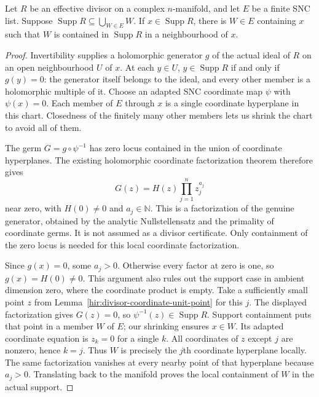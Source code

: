 \begin{lemma}
\label{hir:divisor-supported-local-component}
\leanok
Let $R$ be an effective divisor on a complex $n$-manifold, and let $E$
be a finite SNC list.  Suppose $\operatorname{Supp}R\subseteq\bigcup_{W\in E}W$.
If $x\in\operatorname{Supp}R$, there is $W\in E$ containing $x$ such
that $W$ is contained in $\operatorname{Supp}R$ in a neighbourhood of $x$.
\end{lemma}
\begin{proof}
Invertibility supplies a holomorphic generator $g$ of the actual ideal
of $R$ on an open neighbourhood $U$ of $x$.  At each $y\in U$,
$y\in\operatorname{Supp}R$ if and only if $g(y)=0$: the generator itself
belongs to the ideal, and every other member is a holomorphic multiple
of it.  Choose an adapted SNC coordinate map $\psi$ with $\psi(x)=0$.
Each member of $E$ through $x$ is a single coordinate hyperplane in this
chart.  Closedness of the finitely many other members lets us shrink
the chart to avoid all of them.

The germ $G=g\circ\psi^{-1}$ has zero locus contained in the union of
coordinate hyperplanes.  The existing holomorphic coordinate
factorization theorem therefore gives
\[
 G(z)=H(z)\prod_{j=1}^n z_j^{a_j}
\]
near zero, with $H(0)\ne0$ and $a_j\in\mathbb N$.  This is a factorization
of the genuine generator, obtained by the analytic Nullstellensatz and
the primality of coordinate germs.  It is not assumed as a divisor
certificate.  Only containment of the zero locus is needed for this
local coordinate factorization.

Since $g(x)=0$, some $a_j>0$.  Otherwise every factor at zero is one,
so $g(x)=H(0)\ne0$.  This argument also rules out the support case in
ambient dimension zero, where the coordinate product is empty.
Take a sufficiently small point $z$ from
Lemma~\ref{hir:divisor-coordinate-unit-point} for this $j$.  The displayed
factorization gives $G(z)=0$, so $\psi^{-1}(z)\in\operatorname{Supp}R$.
Support containment puts that point in a member $W$ of $E$; our shrinking
ensures $x\in W$.  Its adapted coordinate equation is $z_k=0$ for a
single $k$.  All coordinates of $z$ except $j$ are nonzero, hence $k=j$.
Thus $W$ is precisely the $j$th coordinate hyperplane locally.
The same factorization vanishes at every nearby point of that
hyperplane because $a_j>0$.  Translating back to the manifold proves
the local containment of $W$ in the actual support.
\end{proof}

